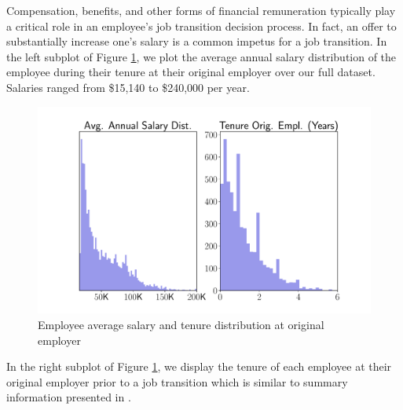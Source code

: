 \documentclass[10pt]{article}
\begin{document}
Compensation, benefits, and other forms of financial remuneration typically play 
a critical role in an employee's job transition decision process.  In fact, an offer to 
substantially increase one's salary is a common impetus for a job transition. 
In the left subplot of Figure \ref{fig:avgsal}, we plot the average 
annual salary distribution 
of the employee during their tenure at their original employer over our full dataset.  
Salaries ranged from \$15,140 to \$240,000 per year.  
%
\begin{figure}[thb]
    \centering
	\includegraphics[width=1.0\linewidth]{avgsal.pdf}
	\caption{Employee average salary and tenure distribution at original employer}
	\label{fig:avgsal}
\end{figure}
%
In the right subplot of Figure \ref{fig:avgsal}, we display the tenure of each 
employee at their original employer prior to a job transition which is similar to
summary information presented in \cite{Smart2016}. 
\end{document}
